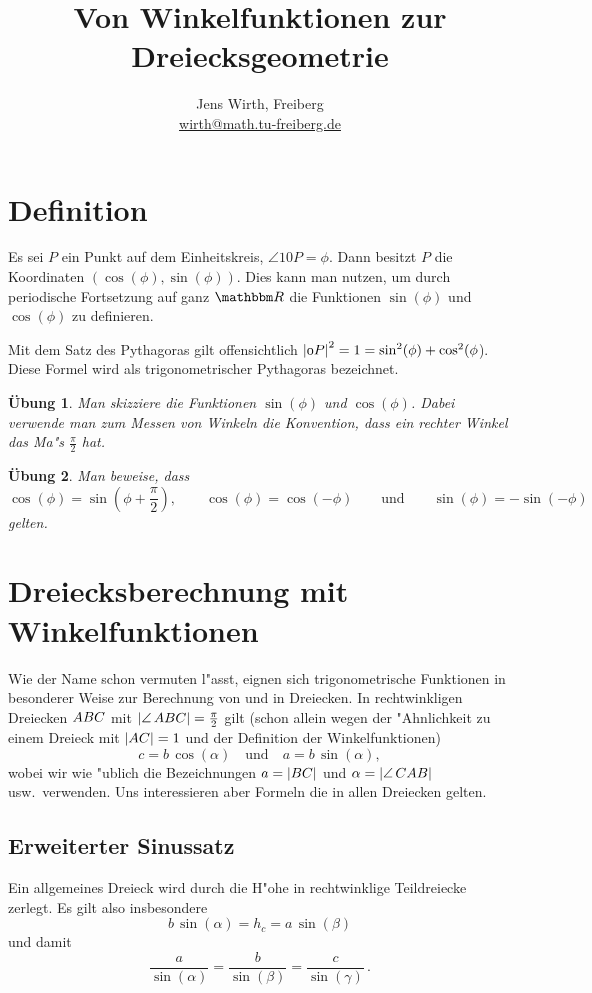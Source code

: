 \documentclass[11pt,a4paper]{article}
\author{Jens Wirth, Freiberg\\ \url{wirth@math.tu-freiberg.de}}
\title{Von Winkelfunktionen zur Dreiecksgeometrie\kosemnetlicensemark}
\date{}
\newtheorem{uebung}{\"{U}bung}
\begin{document}
\maketitle

\section{Definition}
\parbox{6cm}{} 
\hfill
\parbox{6cm}{Es sei $P$ ein Punkt auf dem Einheitskreis, $\angle{10P}=\phi$.
  Dann besitzt $P$ die Koordinaten $(\cos(\phi),\sin(\phi))$. Dies kann man
  nutzen, um durch periodische Fortsetzung auf ganz $\R$ die Funktionen
  $\sin(\phi)$ und $\cos(\phi)$ zu definieren.}

Mit dem Satz des Pythagoras gilt offensichtlich
$\left\vert {\mathnormal{0P}}\right\vert^2=1=\sin^2(\phi)+\cos^2(\phi$). Diese Formel wird als
trigonometrischer Pythagoras bezeichnet.

\begin{uebung}
  Man skizziere die Funktionen $\sin(\phi)$ und $\cos(\phi)$. Dabei verwende
  man zum Messen von Winkeln die Konvention, dass ein rechter Winkel das Ma"s
  $\frac\pi2$ hat.
\end{uebung}
\begin{uebung}\label{u2}
  Man {\glqq}beweise{\grqq}, dass
  \[\cos(\phi)=\sin(\phi+\frac\pi2),\qquad
  \cos(\phi)=\cos(-\phi)\qquad\text{und}\qquad\sin(\phi)=-\sin(-\phi)\]  
  gelten.
\end{uebung}

\section{Dreiecksberechnung mit Winkelfunktionen}
Wie der Name schon vermuten l"asst, eignen sich trigonometrische Funktionen in
besonderer Weise zur Berechnung von und in Dreiecken. In rechtwinkligen
Dreiecken $\ktriangle*{ABC}$ mit $\mangle{ABC}=\frac\pi2$ gilt (schon allein
wegen der "Ahnlichkeit zu einem Dreieck mit $\left\vert {\mathnormal{AC}}\right\vert=1$ und der
Definition der Winkelfunktionen)
\[c=b\,\cos(\alpha)\quad\text{und}\quad a=b\,\sin(\alpha), \]
wobei wir wie "ublich die Bezeichnungen $a=\left\vert {\mathnormal{BC}}\right\vert$ und
$\alpha=\mangle{CAB}$ usw.\ verwenden.  Uns interessieren aber Formeln die in
allen Dreiecken gelten.

\subsection{Erweiterter Sinussatz}
\parbox{6cm}{}
\hfill 
\parbox{6cm}{Ein allgemeines Dreieck wird durch die H"ohe in rechtwinklige
  Teildreiecke zerlegt. Es gilt also insbesondere
\[ b\,\sin(\alpha)=h_c=a\,\sin(\beta)\]
und damit
\[ \frac{a}{\sin(\alpha)}=\frac{b}{\sin(\beta)}=\frac{c}{\sin(\gamma)}\,. \]
}
\end{document}
